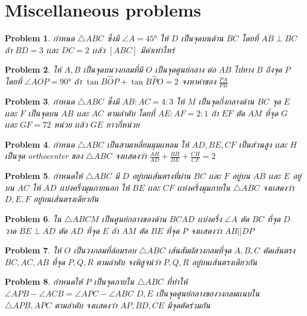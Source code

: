 \documentclass[a4paper,12pt]{article}
\newtheorem{problem}{Problem}[section]
\begin{document}
	\section{Miscellaneous problems}
	\begin{problem}
		กำหนด $\bigtriangleup{ABC}$ ซึ่งมี $\angle{A} = \ang{45}$ ให้ $D$ เป็นจุดบนด้าน $BC$ โดยที่ $\overline{AB} \perp \overline{BC}$ ถ้า $BD = 3$ เเละ $DC = 2 $ เเล้ว $[ABC]$ มีค่าเท่าไหร่
	\end{problem}
	\begin{problem}
		ให้ $A, B$ เป็นจุดบนวงกลมที่มี $O$ เป็นจุดศูนย์กลาง ต่อ $AB$ ไปทาง $B$ ถึงจุด $P$ โดยที่ $\angle{AOP} = \ang{90}$ ถ้า $\tan{B\hat{O}P} + \tan{B\hat{P}O} = 2$ จงหาค่าของ $\frac{PA}{PB}$
	\end{problem}
	\begin{problem}
		กำหนด $\bigtriangleup{ABC}$ ซึ่งมี $AB:AC = 4:3$ ให้ $M$ เป็นจุดกึ่งกลางด้าน $BC$ จุด $E$ เเละ $F$ เป็นจุดบน $AB$ เเละ $AC$ ตามลำดับ โดยที่ $AE:AF = 2:1$ ถ้า $EF$ ตัด $AM$ ที่จุด $G$ เเละ $GF = 72$ หน่วย เเล้ว $GE$ ยาวกี่หน่วย 
	\end{problem}
	\begin{problem}
		กำหนด $\bigtriangleup{ABC}$ เป็นสามเหลี่ยมมุมเเหลม ให้ $AD, BE, CF$ เป็นส่วนสูง เเละ $H$ เป็นจุด orthocenter  ของ $\bigtriangleup{ABC}$ จงเเสดงว่า $\frac{AH}{AD} + \frac{BH}{BE} + \frac{CH}{CF} = 2$
	\end{problem}
	\begin{problem}
		กำหนดให้ $\bigtriangleup{ABC}$ มี $D$ อยู่บนเส้นตรงที่ผ่าน $BC$ เเละ $F$ อยู่บน $AB$ เเละ $E$ อยู่บน $AC$ ให้ $AD$ เเบ่งครึ่งมุมภายนอก ให้ $BE$ เเละ $CF$ เเบ่งครึ่งมุมภายใน $\bigtriangleup{ABC}$ จงเเสดงว่า $D,E,F$ อยู่บนเส้นตรงเดียวกัน 
	\end{problem}
	\begin{problem}
		ใน $\bigtriangleup{ABC} M$ เป็นศูนย์กลางของด้าน $BC AD$ เเบ่งครึ่ง $\angle{A}$ ตัด $BC$ ที่จุด $D$ วาด $\overline{BE} \perp \overline{AD}$ ตัด $AD$ ที่จุด $E$ ถ้า $AM$ ตัด $BE$ ที่จุด $P$ จงเเสดงว่า $AB||DP$
	\end{problem}
	\begin{problem}
		ให้ $O$ เป็นวงกลมที่ล้อมรอบ $\bigtriangleup{ABC}$ เส้นสัมผัสวงกลมที่จุด $A, B, C$ ตัดเส้นตรง $BC, AC ,AB$ ที่จุด $P, Q, R$ ตามลำดับ จงพิสูจน์ว่า $P, Q, R$ อยู่บนเส้นตรงเดียวกัน
	\end{problem}
	\begin{problem}
	
		กำหนดให้ $P$ เป็นจุดภายใน $\bigtriangleup{ABC}$ ที่ทำให้ $\angle{APB}-\angle{ACB} = \angle{APC}-\angle{ABC}$ $ D,E$ เป็นจุดศูนย์กลางของวงกลมเเนบใน $\bigtriangleup{APB},APC$ ตามลำดับ จงเเสดงว่า $AP,BD,CE$ มีจุดตัดร่วมกัน
	\end{problem}
\end{document}
